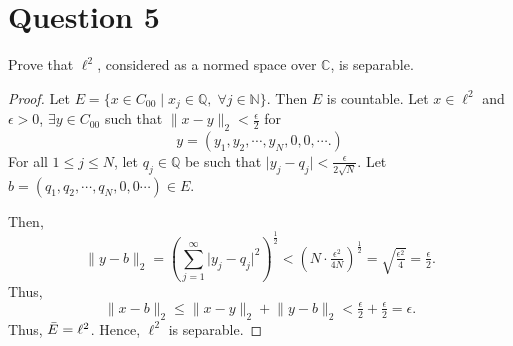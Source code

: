 \section{Question 5}

\begin{question}
    Prove that $\ell^2$, considered as a normed space over $\mathbb{C}$, is separable.
\end{question}

\begin{answer}
    \begin{proof}
        Let $E = \{x \in C_{00} \mid x_j \in \mathbb{Q},\; \forall j \in \mathbb{
        N}\}$. Then $E$ is countable. Let $x \in \ell^2$ and $\epsilon > 0$, $\exists y \in C_{00}$ such that $\lVert x - y \rVert_2 < \tfrac{\epsilon}{2}$ for 
        \begin{equation}
            y = (y_1,y_2,\cdots,y_N,0,0,\cdots.)
        \end{equation}
        For all $1 \leq j \leq N$, let $q_j \in \mathbb{Q}$ be such that $\lvert y_j-q_j \rvert < \tfrac{\epsilon}{2\sqrt{N}}$. Let $b = (q_1,q_2,\cdots,q_N,0,0\cdots) \in E$.
        
        Then,
        \begin{equation}
            \lVert y - b \rVert_2 =\left(\sum_{j=1}^{\infty}\lvert y_j - q_j\rvert^2\right)^{\frac{1}{2}} < (N\cdot \tfrac{\epsilon^2}{4N})^{\frac{1}{2}} = \sqrt{\tfrac{\epsilon^2}{4}} = \tfrac{\epsilon}{2}.
        \end{equation}
        Thus, 
        \begin{equation}
            \lVert x - b\rVert_2 \leq \lVert x - y \lVert_2 + \lVert y - b \rVert_2 < \tfrac{\epsilon}{2} + \tfrac{\epsilon}{2} = \epsilon.
        \end{equation}
        Thus, $\Bar{E} = \ell^2$. Hence, $\ell^2$ is separable.
    \end{proof}
\end{answer}
